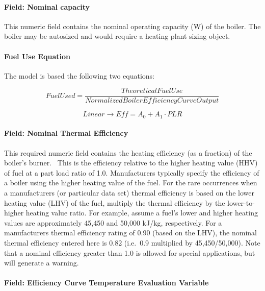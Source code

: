 \paragraph{Field: Nominal capacity}\label{field-nominal-capacity-6}

This numeric field contains the nominal operating capacity (W) of the boiler. The boiler may be autosized and would require a heating plant sizing object.

\paragraph{Fuel Use Equation}\label{fuel-use-equation}

The model is based the following two equations:

\begin{equation}
    FuelUsed = \frac{{TheoreticalFuelUse}}{{NormalizedBoilerEfficiencyCurveOutput}}
\end{equation}

\begin{equation}
    Linear \to Eff = {A_0} + {A_1}\cdot PLR
\end{equation}

\paragraph{Field: Nominal Thermal Efficiency}\label{field-nominal-thermal-efficiency}

This required numeric field contains the heating efficiency (as a fraction) of the boiler's burner.~ This is the efficiency relative to the higher heating value (HHV) of fuel at a part load ratio of 1.0. Manufacturers typically specify the efficiency of a boiler using the higher heating value of the fuel. For the rare occurrences when a manufacturers (or particular data set) thermal efficiency is based on the lower heating value (LHV) of the fuel, multiply the thermal efficiency by the lower-to-higher heating value ratio. For example, assume a fuel's lower and higher heating values are approximately 45,450 and 50,000 kJ/kg, respectively. For a manufacturers thermal efficiency rating of 0.90 (based on the LHV), the nominal thermal efficiency entered here is 0.82 (i.e.~0.9 multiplied by 45,450/50,000). Note that a nominal efficiency greater than 1.0 is allowed for special applications, but will generate a warning.

\paragraph{Field: Efficiency Curve Temperature Evaluation Variable}\label{field-efficiency-curve-temperature-evaluation-variable}


